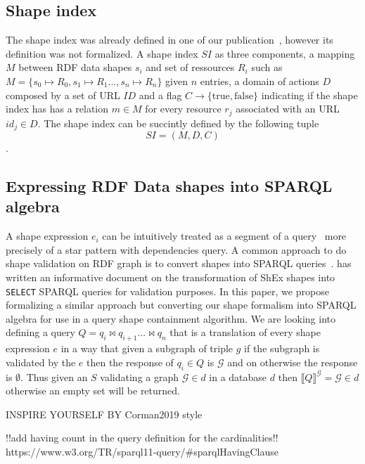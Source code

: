 \fi

\subsection{Shape index}
The shape index was already defined in one of our publication~\cite{tam2024opportunitiesshapebasedoptimizationlink}, however its definition was not formalized.
A shape index $SI$ as three components, a mapping $M$ between RDF data shapes $s_i$ and set of ressources $R_i$ such as $M = \{s_0 \mapsto R_0, s_1 \mapsto R_1..., s_n \mapsto R_n\}$ given $n$ entries,
a domain of actions $D$ composed by a set of URL $ID$ and
a flag $C\rightarrow \{\mathrm{true}, \mathrm{false}\}$ indicating if the shape index has has a relation $m \in M$ for every resource $r_j$ associated with an URL $id_j \in D$. 
The shape index can be succintly defined by the following tuple 
\begin{equation}
SI = (M, D, C)
\end{equation}.

\subsection{Expressing RDF Data shapes into SPARQL algebra}
A shape expression $e_i$ can be intuitively treated as a segment of a query~\cite{delva2023} more precisely of a star pattern with dependencies query.
A common approach to do shape validation on RDF graph is to convert shapes into SPARQL queries~\cite{labragayo2017validatingdescribinglinkeddata, Corman2019, spapeExpressionConvert}.
\citeauthor{spapeExpressionConvert} has written an informative document on the transformation of ShEx shapes into
\texttt{SELECT} SPARQL queries for validation purposes. 
In this paper, we propose formalizing a similar approach but converting our shape formalism into SPARQL algebra for use in a query shape containment algorithm.
We are looking into defining a query $Q = q_i \bowtie q_{i+1} ... \bowtie q_n$ that is a translation of every shape expression $e$ in a way that given a subgraph of triple $g$ if the 
subgraph is validated by the $e$ then the response of $q_i \in Q$ is $\mathcal{G}$ and on otherwise the response is $\emptyset$.
Thus given an $S$ validating a graph $\mathcal{G} \in d$ in a database $d$ then $\llbracket Q \rrbracket^{\mathcal{G}} = \mathcal{G} \in d$ otherwise an empty set will be returned.

INSPIRE YOURSELF BY Corman2019 style

!!add having count in the query definition for the cardinalities!!
https://www.w3.org/TR/sparql11-query/#sparqlHavingClause

